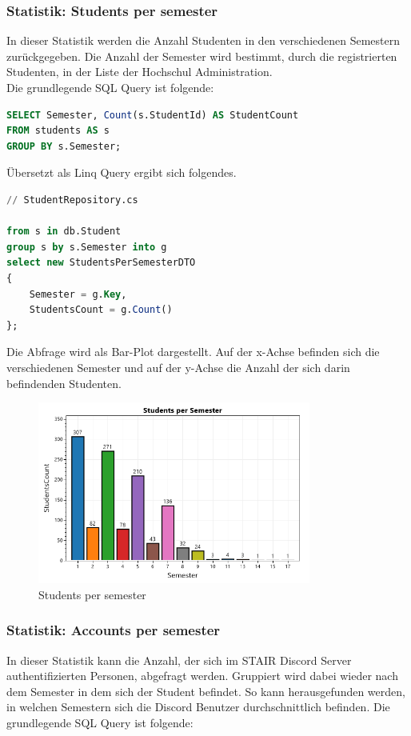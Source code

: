 \documentclass[a4paper, table]{article}
\begin{document}
\newpage
\subsubsection*{Statistik: Students per semester}
In dieser Statistik werden die Anzahl Studenten in den verschiedenen Semestern zurückgegeben.
Die Anzahl der Semester wird bestimmt, durch die registrierten Studenten, in der Liste der Hochschul Administration.\\
Die grundlegende SQL Query ist folgende:

\begin{lstlisting}[language=SQL]
SELECT Semester, Count(s.StudentId) AS StudentCount
FROM students AS s
GROUP BY s.Semester;
\end{lstlisting}

Übersetzt als Linq Query ergibt sich folgendes.

\begin{lstlisting}[language=SQL]
// StudentRepository.cs

from s in db.Student
group s by s.Semester into g
select new StudentsPerSemesterDTO
{
    Semester = g.Key,
    StudentsCount = g.Count()
};
\end{lstlisting}

Die Abfrage wird als Bar-Plot dargestellt. 
Auf der x-Achse befinden sich die verschiedenen Semester und auf der y-Achse die Anzahl der sich darin befindenden Studenten.

\begin{figure}[h]
    \centering
    \includegraphics[width=0.8\textwidth]{img/studentsPerSemester.png}
    \caption{Students per semester}
    \label{fig:students-per-semester}
\end{figure}

\newpage
\subsubsection*{Statistik: Accounts per semester}
In dieser Statistik kann die Anzahl, der sich im STAIR Discord Server authentifizierten Personen, abgefragt werden.
Gruppiert wird dabei wieder nach dem Semester in dem sich der Student befindet.
So kann herausgefunden werden, in welchen Semestern sich die Discord Benutzer durchschnittlich befinden.
Die grundlegende SQL Query ist folgende:
\end{document}
